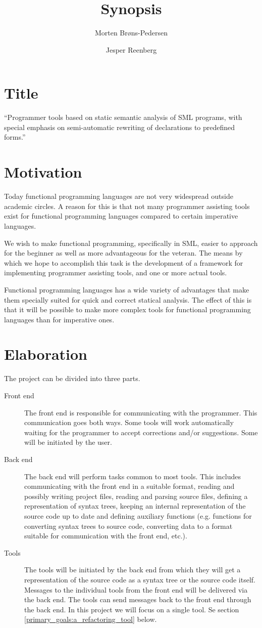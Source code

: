 \documentclass[a4paper,11pt,fleqn]{article}
\author{Morten Brøns-Pedersen \and Jesper Reenberg}
\title{Synopsis}
\begin{document}
\maketitle

\section{Title}
``Programmer tools based on static semantic analysis of SML programs, with special emphasis on
semi-automatic rewriting of declarations to predefined forms.''

\section{Motivation}
Today functional programming languages are not very widespread outside academic circles. A reason
for this is that not many programmer assisting tools exist for functional programming languages
compared to certain imperative languages.

We wish to make functional programming, specifically in SML, easier to approach for the beginner as
well as more advantageous for the veteran. The means by which we hope to accomplish this task is the
development of a framework for implementing programmer assisting tools, and one or more actual
tools.

Functional programming languages has a wide variety of advantages that make them specially suited
for quick and correct statical analysis. The effect of this is that it will be possible to make more
complex tools for functional programming languages than for imperative ones.

\section{Elaboration}
The project can be divided into three parts.
\begin{description}
\item[Front end] The front end is responsible for communicating with the programmer. This
communication goes both ways. Some tools will work automatically waiting for the programmer to
accept corrections and/or suggestions. Some will be initiated by the user.
\item[Back end] The back end will perform tasks common to most tools. This includes communicating
with the front end in a suitable format, reading and possibly writing project files, reading and
parsing source files, defining a representation of syntax trees, keeping an internal representation
of the source code up to date and defining auxiliary functions (e.g. functions for converting syntax
trees to source code, converting data to a format suitable for communication with the front end,
etc.).
\item[Tools] The tools will be initiated by the back end from which they will get a representation
of the source code as a syntax tree or the source code itself. Messages to the individual tools from
the front end will be delivered via the back end. The tools can send messages back to the front end
through the back end. In this project we will focus on a single tool. Se section
\ref{primary_goals:a_refactoring_tool} below.
\end{description}
\end{document}
